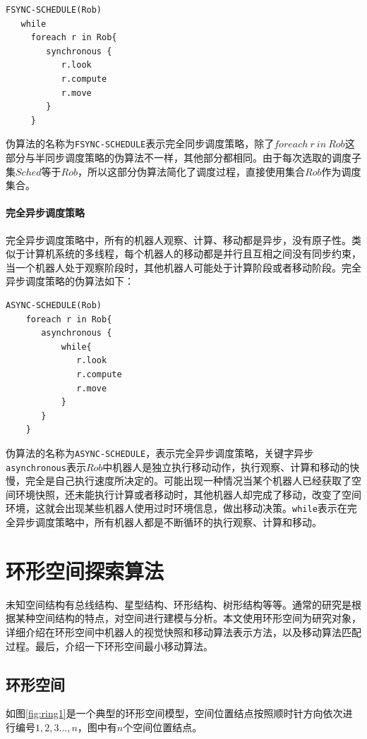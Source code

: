 \begin{lstlisting}
FSYNC-SCHEDULE(Rob)
   while
     foreach r in Rob{
        synchronous {
           r.look
           r.compute
           r.move
        }
     }
\end{lstlisting}

伪算法的名称为\verb|FSYNC-SCHEDULE|表示完全同步调度策略，除了$foreach \ r \ in \ Rob$这部分与半同步调度策略的伪算法不一样，其他部分都相同。由于每次选取的调度子集$Sched$等于$Rob$，所以这部分伪算法简化了调度过程，直接使用集合$Rob$作为调度集合。

\paragraph{完全异步调度策略}
完全异步调度策略中，所有的机器人观察、计算、移动都是异步，没有原子性。类似于计算机系统的多线程，每个机器人的移动都是并行且互相之间没有同步约束，当一个机器人处于观察阶段时，其他机器人可能处于计算阶段或者移动阶段。完全异步调度策略的伪算法如下：

\begin{lstlisting}
ASYNC-SCHEDULE(Rob)
    foreach r in Rob{
       asynchronous {
           while{
              r.look
              r.compute
              r.move
           }
       }
    }
\end{lstlisting}

伪算法的名称为\verb|ASYNC-SCHEDULE|，表示完全异步调度策略，关键字异步\verb|asynchronous|表示$Rob$中机器人是独立执行移动动作，执行观察、计算和移动的快慢，完全是自己执行速度所决定的。可能出现一种情况当某个机器人已经获取了空间环境快照，还未能执行计算或者移动时，其他机器人却完成了移动，改变了空间环境，这就会出现某些机器人使用过时环境信息，做出移动决策。\verb|while|表示在完全异步调度策略中，所有机器人都是不断循环的执行观察、计算和移动。

\section{环形空间探索算法}
未知空间结构有总线结构、星型结构、环形结构、树形结构等等。通常的研究是根据某种空间结构的特点，对空间进行建模与分析。本文使用环形空间为研究对象，详细介绍在环形空间中机器人的视觉快照和移动算法表示方法，以及移动算法匹配过程。最后，介绍一下环形空间最小移动算法。

\subsection{环形空间}
如图\ref{fig:ring1}是一个典型的环形空间模型，空间位置结点按照顺时针方向依次进行编号$1,2,3...,n$，图中有$n$个空间位置结点。

